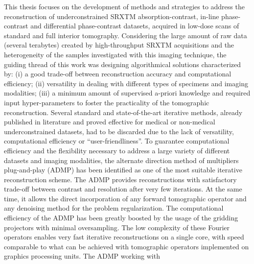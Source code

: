 {%
\newline\newline
This thesis focuses on the development of methods and strategies to address the reconstruction of underconstrained
SRXTM absorption-contrast, in-line phase-contrast and differential phase-contrast datasets, acquired in low-dose scans
of standard and full interior tomography.
Considering the large amount of raw data (several terabytes) created by high-throughput SRXTM acquisitions and the heterogeneity of the samples
investigated with this imaging technique, the guiding thread of this work was designing algorithmical solutions characterized by:
(i) a good trade-off between reconstruction accuracy and computational efficiency; (ii) versatility in dealing with different types of 
specimens and imaging modalities; (iii) a minimum amount of supervised a-priori knowledge and required input hyper-parameters
to foster the  practicality of the tomographic reconstruction.
Several standard and state-of-the-art iterative methods, already published in literature and 
proved effective for medical or non-medical underconstrained datasets, had to be discarded due to the lack of versatility,
computational efficiency or ``user-friendliness''.
\newline\newline
To guarantee computational efficiency and the flexibility necessary to address a large variety of different datasets and imaging modalities,
the alternate direction method of multipliers plug-and-play (ADMP) has been identified as one of the most suitable iterative reconstruction scheme. 
The ADMP provides reconstructions with satisfactory trade-off between contrast and resolution after very few iterations.
At the same time, it allows the direct incorporation of any forward tomographic operator and any denoising method 
for the problem regularization. 
\newline
The computational efficiency of the ADMP has been greatly boosted by the usage of the gridding projectors
with minimal oversampling. The low complexity of these Fourier operators enables very fast iterative reconstructions on a single core, with
speed comparable to what can be achieved with tomographic operators implemented on graphics processing units. The ADMP working with
}
